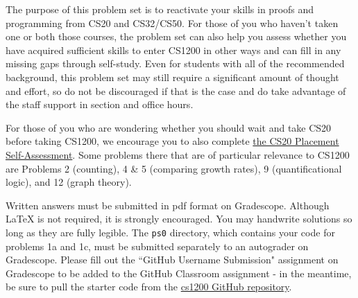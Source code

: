 \documentclass[11pt]{article}
\begin{document}

The purpose of this problem set is to reactivate your skills in proofs and programming from CS20 and CS32/CS50. For those of you who haven't taken one or both those courses, the problem set can also help you assess whether you have acquired sufficient skills to enter CS1200 in other ways and can fill in any missing gaps through self-study. Even for students with all of the recommended background, this problem set may still require a significant amount of thought and effort, so do not be discouraged if that is the case and do take advantage of the staff support in section and office hours. 

For those of you who are wondering whether you should wait and take CS20 before taking CS1200, we encourage you to also complete  \href{https://drive.google.com/file/d/1QIJR6sb9hfkK67PhpQaK9KQBzYwzXvsW/view}{the CS20 Placement Self-Assessment}.  Some problems there that are of particular relevance to CS1200 are Problems 2 (counting), 4 \& 5 (comparing growth rates), 9 (quantificational logic), and 12 (graph theory). 

Written answers must be submitted in pdf format on Gradescope. Although \LaTeX{} is not required, it is strongly encouraged. You may handwrite solutions so long as they are fully legible. The \texttt{ps0} directory, which contains your code for problems 1a and 1c, must be submitted separately to an autograder on Gradescope. Please fill out the ``GitHub Username Submission" assignment on Gradescope to be added to the GitHub Classroom assignment - in the meantime, be sure to pull the starter code from the \href{https://github.com/Harvard-CS-1200/cs1200}{cs1200 GitHub repository}.

 \newcommand{\children}{\mathit{children}}
 \newcommand{\parent}{\mathit{parent}}
 
\end{document}
